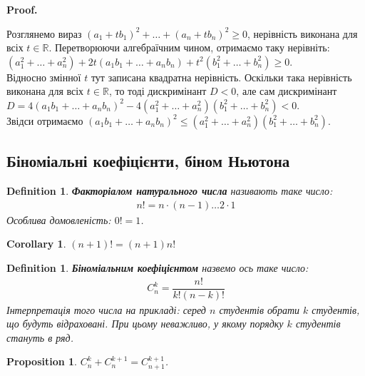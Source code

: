 \documentclass[a4paper, 14pt]{article}
\makeatletter
\def\qed{$\blacksquare$}
\theoremstyle{theoremdd}
\theoremstyle{theoremdd}
\newtheorem{definition}[theorem]{Definition}
\theoremstyle{theoremdd}
\theoremstyle{theoremdd}
\theoremstyle{theoremdd}
\newtheorem{proposition}[theorem]{Proposition}
\theoremstyle{theoremdd}
\theoremstyle{theoremdd}
\theoremstyle{theoremdd}
\newtheorem{corollary}[theorem]{Corollary}
\renewenvironment{proof}[1][Proof.\\]{\par
\pushQED{\hfill \qed}%
\normalfont \topsep6\p@\@plus6\p@\relax
\trivlist
\item\relax
{\bfseries
#1\@addpunct{.}}\hspace\labelsep\ignorespaces
}{%
\popQED\endtrivlist\@endpefalse
}
\makeatother
\begin{document}
	\begin{proof}
	Розглянемо вираз $(a_1+tb_1)^2 + \dots + (a_n + tb_n)^2 \geq 0$, нерівність виконана для всіх $t \in \mathbb{R}$. Перетворюючи алгебраїчним чином, отримаємо таку нерівніть:\\
	$(a_1^2 + \dots + a_n^2) + 2t(a_1b_1 + \dots + a_n b_n) + t^2 (b_1^2 + \dots + b_n^2) \geq 0$.\\
	Відносно змінної $t$ тут записана квадратна нерівність. Оскільки така нерівність виконана для всіх $t \in \mathbb{R}$, то тоді дискримінант $D < 0$, але сам дискримінант\\ $D = 4(a_1b_1 + \dots + a_n b_n)^2 - 4  (a_1^2 + \dots + a_n^2)(b_1^2 + \dots + b_n^2) < 0$.\\
	Звідси отримаємо $(a_1b_1 + \dots + a_n b_n)^2 \leq (a_1^2 + \dots + a_n^2) (b_1^2 + \dots + b_n^2)$.
	\end{proof}
	
	\subsection*{Біноміальні коефіцієнти, біном Ньютона}
	\begin{definition}
	\textbf{Факторіалом натурального числа} називають таке число:
	\begin{align*}
	n! = n \cdot (n-1) \dots 2 \cdot 1
	\end{align*}
	Особлива домовленість: $0! = 1$.
	\end{definition}
	
	\begin{corollary} 
	$(n+1)! = (n+1)n!$
	\end{corollary}
	
	\begin{definition}
	\textbf{Біноміальним коефіцієнтом} назвемо ось таке число:
	\begin{align*}
	C_n^k = \dfrac{n!}{k!(n-k)!}
	\end{align*}
	Інтерпретація того числа на прикладі: серед $n$ студентів обрати $k$ студентів, що будуть відраховані. При цьому неважливо, у якому порядку $k$ студентів стануть в ряд.
	\end{definition}

	\begin{proposition}
	$C_n^k + C_n^{k+1} = C_{n+1}^{k+1}$.
	\end{proposition}
	
\end{document}
